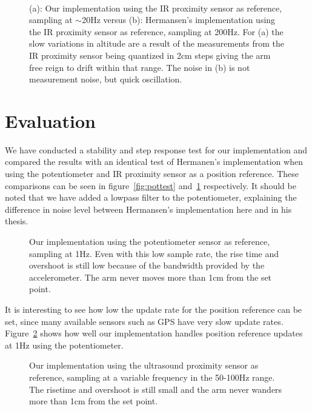 \begin{figure}
	\centering
	\subfloat[][]{\setlength\figureheight{4cm}
		\setlength\figurewidth{7cm}
		
	} \\
	\subfloat[][]{\setlength\figureheight{4cm}
		\setlength\figurewidth{7cm}
		
	}
	\caption{(a): Our implementation using the IR proximity sensor as reference, sampling at \(\sim\)20Hz versus (b): 
	Hermansen's implementation using the IR proximity sensor as reference, sampling at 200Hz. For (a) the slow variations in 
altitude are a result of the measurements from the IR proximity sensor being quantized in 2cm steps giving the arm
free reign to drift within that range. The noise in (b) is not measurement noise, but quick oscillation.}
	\label{fig:irtest}
\end{figure}
\section{Evaluation}\label{sec:evaluation}
We have conducted a stability and step response test for our implementation and compared the results with an identical test of
Hermanen's implementation when using the potentiometer and IR proximity sensor as a position reference. These comparisons can be
seen in figure~\ref{fig:pottest} and~\ref{fig:irtest} respectively. It should be noted that we have added a lowpass filter to the
potentiometer, explaining the difference in noise level between Hermansen's implementation here and in his thesis.
\begin{figure}
	\setlength\figureheight{4cm}
	\setlength\figurewidth{7cm}
	
	\caption{Our implementation using the potentiometer sensor as reference, sampling at 1Hz. Even with this low sample rate, the
		rise time and overshoot is still low because of the bandwidth provided by the accelerometer. The arm never moves more than
		1cm from the set point.}
	\label{fig:pot1hztest}
\end{figure}
It is interesting to see how low the update rate for the position reference can be set, since many available sensors such as GPS 
have very slow update rates. Figure~\ref{fig:pot1hztest} shows how well our implementation handles position reference updates at
1Hz using the potentiometer.
\begin{figure}
	\setlength\figureheight{4cm}
	\setlength\figurewidth{7cm}
	
	\caption{Our implementation using the ultrasound proximity sensor as reference, sampling at a variable frequency in the 50-100Hz 
	range. The risetime and overshoot is still small and the arm never wanders more than 1cm from the set point.}
	\label{fig:ultratest}
\end{figure}


